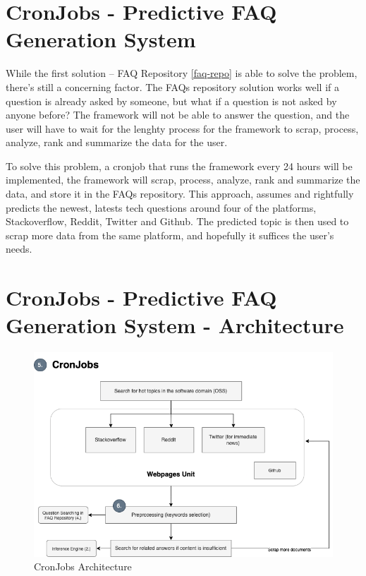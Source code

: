\section{CronJobs - Predictive FAQ Generation System}
While the first solution -- FAQ Repository \ref*{faq-repo} is able to solve the problem, there's still a concerning factor. The FAQs repository solution works well if a question is already asked by someone, but what if a question is not asked by anyone before? The framework will not be able to answer the question, and the user will have to wait for the lenghty process for the framework to scrap, process, analyze, rank and summarize the data for the user.

To solve this problem, a cronjob that runs the framework every 24 hours will be implemented, the framework will scrap, process, analyze, rank and summarize the data, and store it in the FAQs repository. This approach, assumes and rightfully predicts the newest, latests tech questions around four of the platforms, Stackoverflow, Reddit, Twitter and Github. The predicted topic is then used to scrap more data from the same platform, and hopefully it suffices the user's needs.

\section{CronJobs - Predictive FAQ Generation System - Architecture}
\newpage
\begin{figure}[t] 
  \noindent \includegraphics[scale=0.6, angle=0]{assets/cron_job_workflow.png}
\caption{CronJobs Architecture}\label{cronjobs_architecture}
\end{figure}
\newpage

